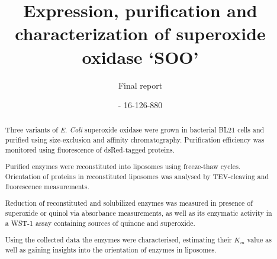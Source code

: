 \documentclass[a4paper,overfullrule=true,9pt]{scrartcl}
\title{Expression, purification and characterization of superoxide oxidase `SOO'}
\subtitle{Final report}
\author{\maillink{michael.senn@students.unibe.ch}{Michael Senn} - 16-126-880}
\date{\printdate}
\newcommand{\ecoli}{\textit{E. Coli}}
\begin{document}
\maketitle

\begin{abstract}
	Three variants of \ecoli{} superoxide oxidase were grown in bacterial
	BL21 cells and purified using size-exclusion and affinity
	chromatography.  Purification efficiency was monitored using
	fluorescence of dsRed-tagged proteins.

	Purified enzymes were reconstituted into liposomes using freeze-thaw
	cycles. Orientation of proteins in reconstituted liposomes was analysed
	by TEV-cleaving and fluorescence measurements. 

	Reduction of reconstituted and solubilized enzymes was measured in
	presence of superoxide or quinol via absorbance measurements, as well
	as its enzymatic activity in a WST-1 assay containing sources of
	quinone and superoxide.

	Using the collected data the enzymes were characterised, estimating
	their $K_m$ value as well as gaining insights into the orientation of
	enzymes in liposomes.
\end{abstract}









\newpage


\end{document}
